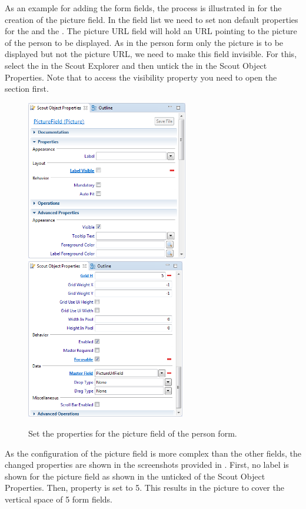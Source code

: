 \documentclass[a4paper,10pt,twoside]{book}
\begin{document}
As an example for adding the form fields, the process is illustrated in  for the creation of the picture field. 
In the field list we need to set non default properties for the  and the . 
The picture URL field will hold an URL pointing to the picture of the person to be displayed. 
As in the person form only the picture is to be displayed but not the picture URL, we need to make this field invisible. 
For this, select the  in the Scout Explorer and then untick the  in the Scout Object Properties. 
Note that to access the visibility property you need to open the section  first. 

\begin{figure}
\includegraphics[height=7cm]{picture_field_properties_1.png} \hspace{5mm}
\includegraphics[height=7cm]{picture_field_properties_2.png}
\caption{Set the properties for the picture field of the person form.}
\end{figure}

As the configuration of the picture field is more complex than the other fields, the changed properties are shown in the screenshots provided in . 
First, no label is shown for the picture field as shown in the unticked  of the Scout Object Properties. 
Then, property  is set to 5. 
This results in the picture to cover the vertical space of 5 form fields. 
\end{document}
